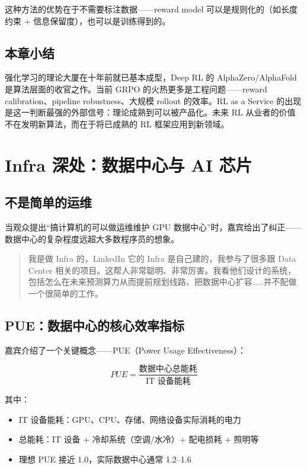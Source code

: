 这种方法的优势在于不需要标注数据——reward model 可以是规则化的（如长度约束 + 信息保留度），也可以是训练得到的。

\subsection{本章小结}

强化学习的理论大厦在十年前就已基本成型，Deep RL 的 AlphaZero/AlphaFold 是算法层面的收官之作。当前 GRPO 的火热更多是工程问题——reward calibration、pipeline robustness、大规模 rollout 的效率。RL as a Service 的出现是这一判断最强的外部信号：理论成熟到可以被产品化。未来 RL 从业者的价值不在发明新算法，而在于将已成熟的 RL 框架应用到新领域。


\section{Infra 深处：数据中心与 AI 芯片}

\subsection{不是简单的运维}

当观众提出``搞计算机的可以做运维维护 GPU 数据中心''时，嘉宾给出了纠正——数据中心的复杂程度远超大多数程序员的想象。

\begin{quote}
我是做 Infra 的，LinkedIn 它的 Infra 是自己建的，我参与了很多跟 Data Center 相关的项目。这帮人非常聪明、非常厉害。我看他们设计的系统，包括怎么在未来预测算力从而提前规划线路、把数据中心扩容……并不配做一个很简单的工作。
\end{quote}

\subsection{PUE：数据中心的核心效率指标}

嘉宾介绍了一个关键概念——PUE（Power Usage Effectiveness）：

$$
PUE = \frac{\text{数据中心总能耗}}{\text{IT 设备能耗}}
$$

其中：
\begin{itemize}
    \item IT 设备能耗：GPU、CPU、存储、网络设备实际消耗的电力
    \item 总能耗：IT 设备 + 冷却系统（空调/水冷）+ 配电损耗 + 照明等
    \item 理想 PUE 接近 1.0，实际数据中心通常 1.2--1.6
\end{itemize}

